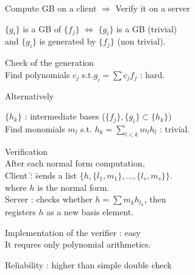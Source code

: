 \documentclass{slides}
\begin{document}
\parskip 5pt

{\color{red} Compute GB on a client $\Rightarrow$ Verify it on a server}

{\color{red} $\{g_i\}$ is a GB of $\{f_j\}$} 
$\Leftrightarrow$ $\{g_i\}$ is a GB (trivial)\\
and {\color{green} $\{g_i\}$ is generated by $\{f_j\}$ (non trivial)}.

\vskip 10pt

{\color{red} Check of the generation}\\
Find {\color{turquoise} polynomials} $c_j$ s.t.$g_i = \sum c_jf_j$ : {\color{red} hard}.

{\color{orange} Alternatively}

$\{h_k\}$ : intermediate bases ($\{f_j\}, \{g_i\}\subset \{h_k\}$)\\
Find {\color{turquoise} monomials} $m_l$ s.t. $h_k = \displaystyle{\sum_{l<k} m_l h_l}$ : {\color{SeaGreen} trivial}.

\medbreak

\begin{tabbing}
{\color{red} Verification}\\
After each normal form computation,\\
{\color{green} Client} \=: \= sends a list $\{h,\{l_1,m_1\},\ldots,\{l_s,m_s\}\}$.\\
\>\>where $h$ is the normal form.\\
{\color{green} Server}  \>: \> checks whether  $h=\sum m_k h_{l_k}$, then\\
\>\> registers $h$ as a new basis element.
\end{tabbing}

\medbreak

{\color{red} Implementation of the verifier} : {\color{SeaGreen}easy}\\
\quad It requres only polynomial arithmetics.

{\color{red} Reliability} : {\color{SeaGreen} higher than simple double check}
\vskip 20pt
\rightline{ {\color{red} {\tt http://www.openxm.org} }}
\end{document}

